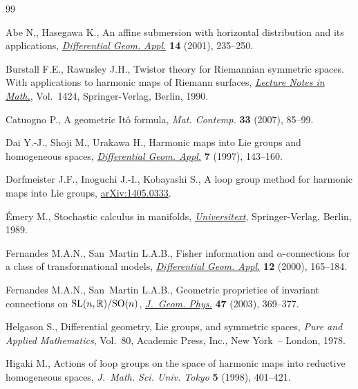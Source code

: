 \documentclass[10pt,a4paper]{amsart}
\numberwithin{equation}{section}
\begin{document}
\begin{thebibliography}{99}
\footnotesize \itemsep=-1pt

Abe N., Hasegawa K., An af\/f\/ine submersion with horizontal distribution and its
  applications, \href{http://dx.doi.org/10.1016/S0926-2245(01)00034-1}{\textit{Differential Geom. Appl.}} \textbf{14} (2001), 235--250.

Burstall F.E., Rawnsley J.H., Twistor theory for {R}iemannian symmetric spaces.
  With applications to harmonic maps of Riemann surfaces, \href{http://dx.doi.org/10.1007/BFb0095561}{\textit{Lecture Notes
  in Math.}}, Vol.~1424, Springer-Verlag, Berlin, 1990.

Catuogno P., A geometric {I}t\^o formula, \textit{Mat. Contemp.} \textbf{33}
  (2007), 85--99.

Dai Y.-J., Shoji M., Urakawa H., Harmonic maps into {L}ie groups and homogeneous
  spaces, \href{http://dx.doi.org/10.1016/S0926-2245(96)00045-9}{\textit{Differential Geom. Appl.}} \textbf{7} (1997), 143--160.

Dorfmeister J.F., Inoguchi J.-I., Kobayashi S., A loop group method for harmonic
  maps into Lie groups, \href{http://arxiv.org/abs/1405.0333}{arXiv:1405.0333}.

{\'E}mery M., Stochastic calculus in manifolds, \href{http://dx.doi.org/10.1007/978-3-642-75051-9}{\textit{Universitext}}, Springer-Verlag,
  Berlin, 1989.

Fernandes M.A.N., San~Martin L.A.B., Fisher information and
  {$\alpha$}-connections for a class of transformational models,
  \href{http://dx.doi.org/10.1016/S0926-2245(00)00010-3}{\textit{Differential Geom. Appl.}} \textbf{12} (2000), 165--184.

Fernandes M.A.N., San~Martin L.A.B., Geometric proprieties of invariant
  connections on {${\rm SL}(n,{\mathbb R})/{\rm SO}(n)$}, \href{http://dx.doi.org/10.1016/S0393-0440(02)00225-5}{\textit{J.~Geom.
  Phys.}} \textbf{47} (2003), 369--377.

Helgason S., Dif\/ferential geometry, {L}ie groups, and symmetric spaces,
  \textit{Pure and Applied Mathematics}, Vol.~80, Academic Press, Inc., New
  York~-- London, 1978.

Higaki M., Actions of loop groups on the space of harmonic maps into reductive
  homogeneous spaces, \textit{J.~Math. Sci. Univ. Tokyo} \textbf{5} (1998),
  401--421.


\end{thebibliography}
\end{document}
